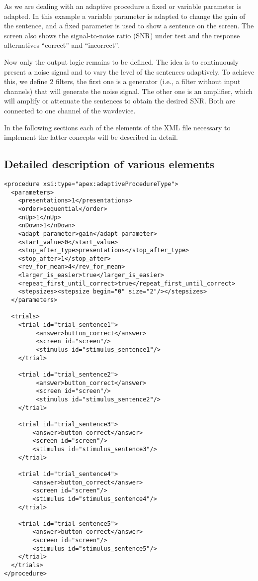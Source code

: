 As we are dealing with an adaptive procedure a fixed or variable
parameter is adapted. In this example a variable parameter is
adapted to change the gain of the sentence, and a fixed parameter
is used to show a sentence on the screen. The screen also shows
the signal-to-noise ratio (SNR) under test and the response
alternatives ``correct'' and ``incorrect''.

Now only the output logic remains to be defined. The idea is to
continuously present a noise signal and to vary the level of the
sentences adaptively. To achieve this, we define 2 filters, the
first one is a generator (i.e., a filter without input channels)
that will generate the noise signal. The other one is an
amplifier, which will amplify or attenuate the sentences to obtain
the desired SNR. Both are connected to one channel of the
wavdevice.

In the following sections each of the elements of the XML file
necessary to implement the latter concepts will be described in
detail.

\subsection{Detailed description of various elements}

\begin{lstlisting}
<procedure xsi:type="apex:adaptiveProcedureType">
  <parameters>
    <presentations>1</presentations>
    <order>sequential</order>
    <nUp>1</nUp>
    <nDown>1</nDown>
    <adapt_parameter>gain</adapt_parameter>
    <start_value>0</start_value>
    <stop_after_type>presentations</stop_after_type>
    <stop_after>1</stop_after>
    <rev_for_mean>4</rev_for_mean>
    <larger_is_easier>true</larger_is_easier>
    <repeat_first_until_correct>true</repeat_first_until_correct>
    <stepsizes><stepsize begin="0" size="2"/></stepsizes>
  </parameters>

  <trials>
    <trial id="trial_sentence1">
         <answer>button_correct</answer>
         <screen id="screen"/>
         <stimulus id="stimulus_sentence1"/>
    </trial>

    <trial id="trial_sentence2">
         <answer>button_correct</answer>
         <screen id="screen"/>
         <stimulus id="stimulus_sentence2"/>
    </trial>

    <trial id="trial_sentence3">
        <answer>button_correct</answer>
        <screen id="screen"/>
        <stimulus id="stimulus_sentence3"/>
    </trial>

    <trial id="trial_sentence4">
        <answer>button_correct</answer>
        <screen id="screen"/>
        <stimulus id="stimulus_sentence4"/>
    </trial>

    <trial id="trial_sentence5">
        <answer>button_correct</answer>
        <screen id="screen"/>
        <stimulus id="stimulus_sentence5"/>
    </trial>
  </trials>
</procedure>
\end{lstlisting}


